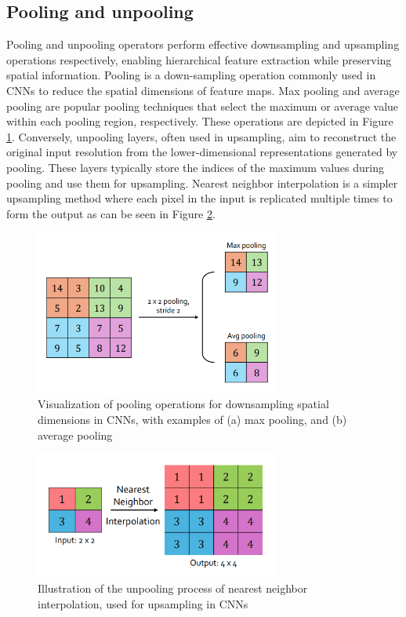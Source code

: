 \subsection{Pooling and unpooling} Pooling and unpooling operators perform effective downsampling and upsampling operations respectively, enabling hierarchical feature extraction while preserving spatial information. Pooling is a down-sampling operation commonly used in CNNs to reduce the spatial dimensions of feature maps. Max pooling and average pooling are popular pooling techniques that select the maximum or average value within each pooling region, respectively. These operations are depicted in Figure \ref{fig:Pool}. Conversely, unpooling layers, often used in upsampling, aim to reconstruct the original input resolution from the lower-dimensional representations generated by pooling. These layers typically store the indices of the maximum values during pooling and use them for upsampling. Nearest neighbor interpolation is a simpler upsampling method where each pixel in the input is replicated multiple times to form the output as can be seen in Figure \ref{fig:Unpool2}.
\begin{figure}[ht]
    \centering
    \includegraphics[width=8cm]{images/Theory-DL/Pool.png}
    \caption{Visualization of pooling operations for downsampling spatial dimensions in CNNs, with examples of (a) max pooling, and (b) average pooling}
    \label{fig:Pool}
\end{figure}
\begin{figure}[ht]
        \centering
        \includegraphics[width=8cm]{images/Theory-DL/NNUnpool.png}
        \caption{Illustration of the unpooling process of nearest neighbor interpolation, used for upsampling in CNNs}
        \label{fig:Unpool2}
    \end{figure}
